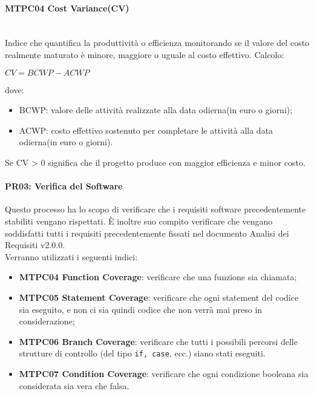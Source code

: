 \paragraph{MTPC04 Cost Variance(CV)}\-\\
Indice che quantifica la produttività o efficienza monitorando se il valore del costo realmente maturato è minore, maggiore o uguale al costo effettivo.
Calcolo:
\begin{center}
	$CV = BCWP - ACWP$
\end{center}
dove:
\begin{itemize}
	\item BCWP: valore delle attività realizzate alla data odierna(in euro o giorni);
	\item ACWP: costo effettivo sostenuto per completare le attività alla data odierna(in euro o giorni).
\end{itemize}
Se CV > 0 significa che il progetto produce con maggior efficienza e minor costo.
\fi

\paragraph{PR03: Verifica del Software}
Questo processo ha lo scopo di verificare che i requisiti software precedentemente stabiliti vengano rispettati. È inoltre suo compito verificare che vengano soddisfatti
tutti i requisiti precedentemente fissati nel documento Analisi dei Requisiti v2.0.0. \-\\ Verranno utilizzati i seguenti indici:

\begin{itemize}
	\item \textbf{MTPC04 Function Coverage}: verificare che una funzione sia chiamata;
	\item \textbf{MTPC05 Statement Coverage}: verificare che ogni statement del codice sia eseguito, e non ci sia quindi codice che non verrà mai preso in considerazione;
	\item \textbf{MTPC06 Branch Coverage}: verificare che tutti i possibili percorsi delle strutture di controllo (del tipo \texttt{if, case}, ecc.) siano stati eseguiti.
	\item \textbf{MTPC07 Condition Coverage}: verificare che ogni condizione booleana sia considerata sia vera che falsa.
\end{itemize}

